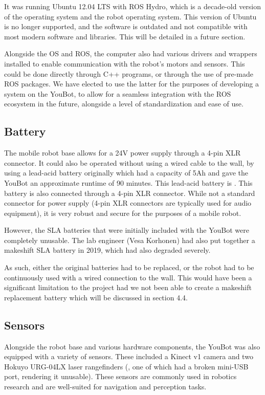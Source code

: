 \documentclass[a4paper, 12pt]{article}
\newif\ifshownotes
\newcommand{\notes}[1]{\ifshownotes\textcolor{blue}{#1}\fi}
\begin{document}
    It was running Ubuntu 12.04 LTS with ROS Hydro, which is a decade-old version of the operating system and the robot operating system. This version of Ubuntu is no longer supported, and the software is outdated and not compatible with most modern software and libraries. This will be detailed in a future section.

    Alongside the OS and ROS, the computer also had various drivers and wrappers installed to enable communication with the robot's motors and sensors. This could be done directly through C++ programs, or through the use of pre-made ROS packages. We have elected to use the latter for the purposes of developing a system on the YouBot, to allow for a seamless integration with the ROS ecosystem in the future, alongside a level of standardization and ease of use. 


    \subsection{Battery}
    
    The mobile robot base allows for a 24V power supply through a 4-pin XLR connector. It could also be operated without using a wired cable to the wall, by using a lead-acid battery originally which had a capacity of 5Ah and gave the YouBot an approximate runtime of 90 minutes. This lead-acid battery is \notes{[dimensions here]}. This battery is also connected through a 4-pin XLR connector. While not a standard connector for power supply (4-pin XLR connectors are typically used for audio equipment), it is very robust and secure for the purposes of a mobile robot. 

    However, the SLA batteries that were initially included with the YouBot were completely unusable. The lab engineer (Vesa Korhonen) had also put together a makeshift SLA battery in 2019, which had also degraded severely. 

    As such, either the original batteries had to be replaced, or the robot had to be continuously used with a wired connection to the wall. This would have been a significant limitation to the project had we not been able to create a makeshift replacement battery which will be discussed in section 4.4.
    

    \subsection{Sensors}
    
    Alongside the robot base and various hardware components, the YouBot was also equipped with a variety of sensors. These included a Kinect v1 camera and two Hokuyo URG-04LX laser rangefinders (, one of which had a broken mini-USB port, rendering it unusable). These sensors are commonly used in robotics research and are well-suited for navigation and perception tasks.
\end{document}
